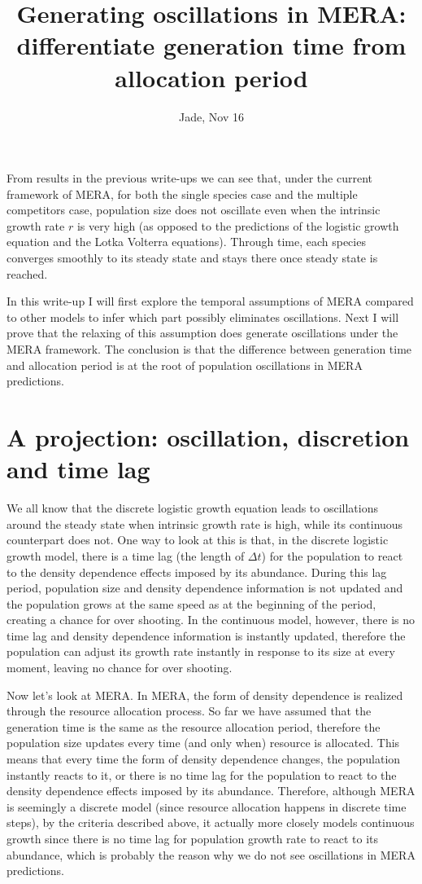 \documentclass[12pt]{article}
\date{}
\title{\Large \textbf{Generating oscillations in MERA: differentiate generation time from allocation period}}
\author{Jade, Nov 16}
\begin{document}
\maketitle
\raggedright
\large
\setlength{\parindent}{15pt}

From results in the previous write-ups we can see that, under the current framework of MERA, for both the single species case and the multiple competitors case, population size does not oscillate even when the intrinsic growth rate $r$ is very high (as opposed to the predictions of the logistic growth equation and the Lotka Volterra equations). Through time, each species converges smoothly to its steady state and stays there once steady state is reached. 

In this write-up I will first explore the temporal assumptions of MERA compared to other models to infer which part possibly eliminates oscillations. Next I will prove that the relaxing of this assumption does generate oscillations under the MERA framework. The conclusion is that the difference between generation time and allocation period is at the root of population oscillations in MERA predictions.

\section{A projection: oscillation, discretion and time lag}

We all know that the discrete logistic growth equation leads to oscillations around the steady state when intrinsic growth rate is high, while its continuous counterpart does not. One way to look at this is that, in the discrete logistic growth model, there is a time lag (the length of $\Delta t$) for the population to react to the density dependence effects imposed by its abundance. During this lag period, population size and density dependence information is not updated and the population grows at the same speed as at the beginning of the period, creating a chance for over shooting. In the continuous model, however, there is no time lag and density dependence information is instantly updated, therefore the population can adjust its growth rate instantly in response to its size at every moment, leaving no chance for over shooting. 

Now let's look at MERA. In MERA, the form of density dependence is realized through the resource allocation process. So far we have assumed that the generation time is the same as the resource allocation period, therefore the population size updates every time (and only when) resource is allocated. This means that every time the form of density dependence changes, the population instantly reacts to it, or there is no time lag for the population to react to the density dependence effects imposed by its abundance. Therefore, although MERA is seemingly a discrete model (since resource allocation happens in discrete time steps), by the criteria described above, it actually more closely models continuous growth since there is no time lag for population growth rate to react to its abundance, which is probably the reason why we do not see oscillations in MERA predictions. 
\end{document}

